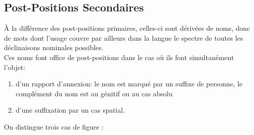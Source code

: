\documentclass{cours}
\begin{document}
\subsection{Post-Positions Secondaires}
À  la différence des post-positions \og primaires\fg, celles-ci sont dérivées de noms, donc de mots dont l'usage couvre par ailleurs dans la langue le spectre de toutes les déclinaisons nominales possibles.\\
Ces noms font office de post-positions dans le cas où ils font simultanément l'objet:
\begin{enumerate}
    \item d'un rapport d'annexion: le nom est marqué par un suffixe de personne, le complément du nom est au génitif ou au cas absolu
    \item d'une suffixation par un cas spatial.
\end{enumerate}
On distingue trois cas de figure :
\end{document}
